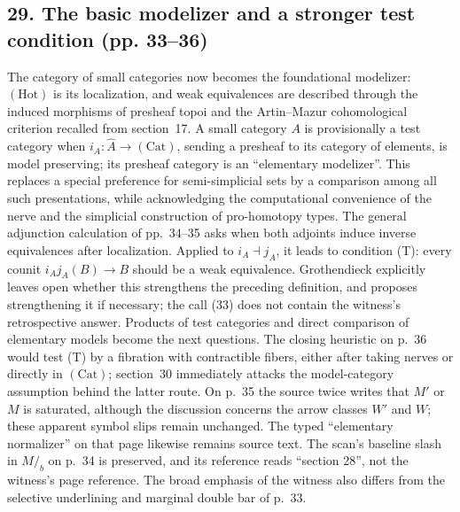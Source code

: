 \subsection*{29. The basic modelizer and a stronger test condition (pp. 33--36)}
The category of small categories now becomes the foundational modelizer: $(\mathrm{Hot})$ is its localization, and weak equivalences are described through the induced morphisms of presheaf topoi and the Artin--Mazur cohomological criterion recalled from section~17. A small category $A$ is provisionally a test category when $i_A\colon\widehat A\to(\mathrm{Cat})$, sending a presheaf to its category of elements, is model preserving; its presheaf category is an ``elementary modelizer''. This replaces a special preference for semi-simplicial sets by a comparison among all such presentations, while acknowledging the computational convenience of the nerve and the simplicial construction of pro-homotopy types. The general adjunction calculation of pp.~34--35 asks when both adjoints induce inverse equivalences after localization. Applied to $i_A\dashv j_A$, it leads to condition (T): every counit $i_Aj_A(B)\to B$ should be a weak equivalence. Grothendieck explicitly leaves open whether this strengthens the preceding definition, and proposes strengthening it if necessary; the call (33) does not contain the witness's retrospective answer. Products of test categories and direct comparison of elementary models become the next questions. The closing heuristic on p.~36 would test (T) by a fibration with contractible fibers, either after taking nerves or directly in $(\mathrm{Cat})$; section~30 immediately attacks the model-category assumption behind the latter route. On p.~35 the source twice writes that $M'$ or $M$ is saturated, although the discussion concerns the arrow classes $W'$ and $W$; these apparent symbol slips remain unchanged. The typed ``elementary normalizer'' on that page likewise remains source text. The scan's baseline slash in $M/_{b}$ on p.~34 is preserved, and its reference reads ``section 28'', not the witness's page reference. The broad emphasis of the witness also differs from the selective underlining and marginal double bar of p.~33.

